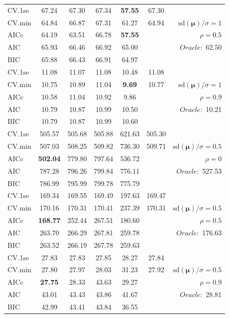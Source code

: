 \begin{table}
\begin{center}
\begin{tabular}{l*{5}{c}|r}
 \hline 
CV.1se & 67.24 & 67.30 & 67.34 & {\bf 57.55} & 67.30 & \\
CV.min & 64.84 & 66.87 & 67.31 & 61.27 & 64.94 &  $\mathrm{sd}(\mathbf{\mu})/\sigma=1$ \\
AICc & 64.19 & 63.51 & 66.78 & {\bf 57.55} & & $\rho=0.5$ \\
AIC & 65.93 & 66.46 & 66.92 & 65.00 & &  \multirow{2}{*}{$Oracle: $ 62.50} \\
BIC & 65.88 & 66.43 & 66.91 & 64.97 & &  \\
 \hline 
CV.1se & 11.08 & 11.07 & 11.08 & 10.48 & 11.08 & \\
CV.min & 10.75 & 10.89 & 11.04 & {\bf 9.69} & 10.77 &  $\mathrm{sd}(\mathbf{\mu})/\sigma=1$ \\
AICc & 10.58 & 11.04 & 10.92 & 9.86 & & $\rho=0.9$ \\
AIC & 10.79 & 10.87 & 10.99 & 10.50 & &  \multirow{2}{*}{$Oracle: $ 10.21} \\
BIC & 10.79 & 10.87 & 10.99 & 10.60 & &  \\
 \hline 
CV.1se & 505.57 & 505.68 & 505.88 & 621.63 & 505.30 & \\
CV.min & 507.03 & 508.25 & 509.82 & 736.30 & 509.71 &  $\mathrm{sd}(\mathbf{\mu})/\sigma=0.5$ \\
AICc & {\bf 502.04} & 779.80 & 797.64 & 536.72 & & $\rho=0$ \\
AIC & 787.28 & 796.26 & 799.84 & 776.11 & &  \multirow{2}{*}{$Oracle: $ 527.53} \\
BIC & 786.99 & 795.99 & 799.78 & 775.79 & &  \\
 \hline 
CV.1se & 169.34 & 169.55 & 169.49 & 197.63 & 169.47 & \\
CV.min & 170.16 & 170.31 & 170.41 & 237.39 & 170.31 &  $\mathrm{sd}(\mathbf{\mu})/\sigma=0.5$ \\
AICc & {\bf 168.77} & 252.44 & 267.51 & 180.60 & & $\rho=0.5$ \\
AIC & 263.70 & 266.29 & 267.81 & 259.78 & &  \multirow{2}{*}{$Oracle: $ 176.63} \\
BIC & 263.52 & 266.19 & 267.78 & 259.63 & &  \\
 \hline 
CV.1se & 27.83 & 27.83 & 27.85 & 28.27 & 27.84 & \\
CV.min & 27.80 & 27.97 & 28.03 & 31.23 & 27.92 &  $\mathrm{sd}(\mathbf{\mu})/\sigma=0.5$ \\
AICc & {\bf 27.75} & 28.33 & 43.63 & 29.27 & & $\rho=0.9$ \\
AIC & 43.01 & 43.43 & 43.86 & 41.67 & &  \multirow{2}{*}{$Oracle: $ 28.81} \\
BIC & 42.99 & 43.41 & 43.84 & 36.55 & &  \\
 \hline 
\end{tabular}
\end{center}
\vspace{-1cm}
\end{table}





